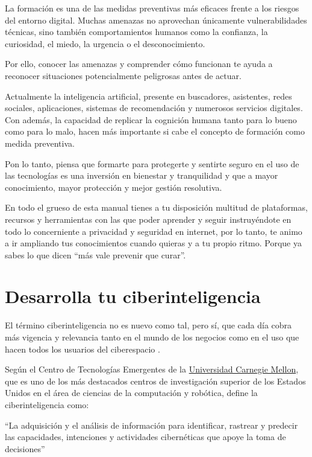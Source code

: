 \documentclass[
  spanish,
  a4paper,
  openany]{book}
\begin{document}
La formación es una de las medidas preventivas más eficaces frente a los riesgos del entorno digital. Muchas amenazas no aprovechan únicamente vulnerabilidades técnicas, sino también comportamientos humanos como la confianza, la curiosidad, el miedo, la urgencia o el desconocimiento.

Por ello, conocer las amenazas y comprender cómo funcionan te ayuda a reconocer situaciones potencialmente peligrosas antes de actuar.

Actualmente la inteligencia artificial, presente en buscadores, asistentes, redes sociales, aplicaciones, sistemas de recomendación y numerosos servicios digitales. Con además, la capacidad de replicar la cognición humana tanto para lo bueno como para lo malo, hacen más importante si cabe el concepto de formación como medida preventiva.

Pon lo tanto, piensa que formarte para protegerte y sentirte seguro en el uso de las tecnologías es una inversión en bienestar y tranquilidad y que a mayor conocimiento, mayor protección y mejor gestión resolutiva.

En todo el grueso de esta manual tienes a tu disposición multitud de plataformas, recursos y herramientas con las que poder aprender y seguir instruyéndote en todo lo concerniente a privacidad y seguridad en internet, por lo tanto, te animo a ir ampliando tus conocimientos cuando quieras y a tu propio ritmo. Porque ya sabes lo que dicen ``más vale prevenir que curar''.

\section{Desarrolla tu ciberinteligencia}\label{desarrolla-tu-ciberinteligencia}

El término ciberinteligencia no es nuevo como tal, pero sí, que cada día cobra más vigencia y relevancia tanto en el mundo de los negocios como en el uso que hacen todos los usuarios del ciberespacio \citep{ciberinteligencia}.

Según el Centro de Tecnologías Emergentes de la \href{https://es.wikipedia.org/wiki/Universidad_Carnegie_Mellon}{Universidad Carnegie Mellon}, que es uno de los más destacados centros de investigación superior de los Estados Unidos en el área de ciencias de la computación y robótica, define la ciberinteligencia como:

``La adquisición y el análisis de información para identificar, rastrear y predecir las capacidades, intenciones y actividades cibernéticas que apoye la toma de decisiones''
\end{document}
